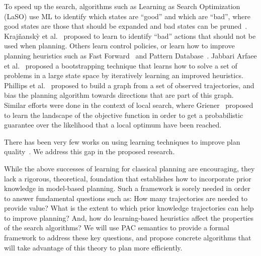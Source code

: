 \documentclass[12pt]{article}
\begin{document}
To speed up the search, algorithms such as Learning as Search Optimization (LaSO) use ML to identify which states are ``good'' and which are ``bad'', where good states are those that should be expanded and bad states can be pruned~\cite{xu2007discriminative}. %
Kraj{\v{n}}ansk{\`y} et al.~\cite{krajvnansky2014learning} proposed to learn to identify ``bad'' actions that should not be used when planning. 
Others learn control policies, or learn how to improve planning heuristics such as Fast Forward~\cite{yoon2008learning} and Pattern Database~\cite{samadi2008learning}. Jabbari Arfaee et al.~\cite{arfaee2011learning} proposed a bootstrapping technique that learns how to solve a set of problems in a large state space by iteratively learning an improved heuristics. 
Phillips et al.~\cite{phillips2012graphs} proposed to build a graph from a set of observed trajectories, and bias the planning algorithm towards directions that are part of this graph. Similar efforts were done in the context of local search, 
where Griener~\cite{greiner1996palo} proposed to learn
the landscape of the objective function in order to get a probabilistic guarantee over the likelihood that a local optimum have been reached. 

 There has been very few works on using learning techniques to improve plan quality~\cite{zimmerman2003learning}. We address this gap in the proposed research. %



While the above successes of learning for classical planning are encouraging, they lack a rigorous, theoretical, foundation that establishes how to incorporate prior knowledge in model-based planning. Such a framework is sorely needed in order to answer fundamental questions such as: How many trajectories are needed to provide value? What is the extent to which prior knowledge trajectories can help to improve planning? And, how do learning-based heuristics affect the properties of the search algorithms? We will use PAC semantics  to provide a formal framework to address these key questions, and propose concrete algorithms that will take advantage of this theory to plan more efficiently. 
\end{document}
